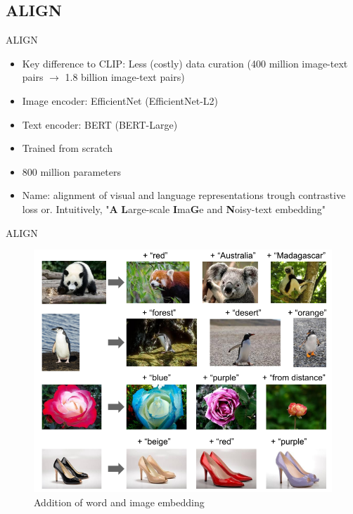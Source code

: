 \documentclass[xcolor=dvipsnames]{beamer}
\begin{document}
\subsection{ALIGN} %
\begin{frame}{ALIGN \parencite{jia2021scaling}}
  \begin{itemize}
    \item Key difference to CLIP: Less (costly) data curation (400 million image-text pairs $\rightarrow$ 1.8 billion image-text pairs)
    \item Image encoder: EfficientNet (EfficientNet-L2)
    \item Text encoder: BERT (BERT-Large)  %
    \item Trained from scratch
    \item 800 million parameters \parencite{alford2021alignparams}
    \item Name: alignment of visual and language representations trough contrastive loss or. Intuitively, "\textbf{A} \textbf{L}arge-scale \textbf{I}ma\textbf{G}e and \textbf{N}oisy-text embedding"
  \end{itemize}
\end{frame}

\begin{frame}{ALIGN \parencite{jia2021scaling}}
  \begin{figure}[ht]
    \centering
    \includegraphics[width=0.7\linewidth]{../../figures/02-04-text-support-img/align-word-and-image-addition}
    \caption{Addition of word and image embedding}
  \end{figure}
\end{frame}
\end{document}
